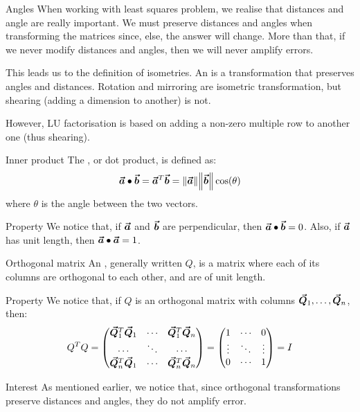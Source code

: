 \documentclass[a4paper]{article}
\begin{document}
\begin{parag}{Angles}
    When working with least squares problem, we realise that distances and angle are really important. We must preserve distances and angles when transforming the matrices since, else, the answer will change. More than that, if we never modify distances and angles, then we will never amplify errors.

    This leads us to the definition of isometries. An  is a transformation that preserves angles and distances. Rotation and mirroring are isometric transformation, but shearing (adding a dimension to another) is not.

    However, LU factorisation is based on adding a non-zero multiple row to another one (thus shearing).
\end{parag}

\begin{parag}{Inner product}
    The , or dot product, is defined as: 
    \[\bvec{a} \dotprod \bvec{b} = \bvec{a}^T \bvec{b} = \left\|\bvec{a}\right\| \left\|\bvec{b}\right\| \cos\left(\theta\right)\]
    where $\theta$ is the angle between the two vectors.

    \begin{subparag}{Property}
        We notice that, if $\bm{\protect\vec{a}}$ and $\bm{\protect\vec{b}}$ are perpendicular, then $\bm{\protect\vec{a}} \bullet \bm{\protect\vec{b}} = 0$. Also, if $\bm{\protect\vec{a}}$ has unit length, then $\bm{\protect\vec{a}} \bullet \bm{\protect\vec{a}} = 1$.
    \end{subparag}
\end{parag}

\begin{parag}{Orthogonal matrix}
    An , generally written $Q$, is a matrix where each of its columns are orthogonal to each other, and are of unit length.

    \begin{subparag}{Property}
        We notice that, if $Q$ is an orthogonal matrix with columns $\bm{\protect\vec{Q}}_1, \ldots, \bm{\protect\vec{Q}}_n$, then: 
        \[Q^T Q = \begin{pmatrix} \bm{\protect\vec{Q}}_1^T \bm{\protect\vec{Q}}_1 & \cdots & \bm{\protect\vec{Q}}_1^T \bm{\protect\vec{Q}}_n \\ \cdots & \ddots & \cdots \\ \bm{\protect\vec{Q}}_n^T \bm{\protect\vec{Q}}_1 & \cdots & \bm{\protect\vec{Q}}_n^T \bm{\protect\vec{Q}}_n \end{pmatrix} = \begin{pmatrix} 1 & \cdots & 0 \\ \vdots & \ddots & \vdots \\ 0 & \cdots & 1 \end{pmatrix} = I \]
    \end{subparag}
    
    \begin{subparag}{Interest}
        As mentioned earlier, we notice that, since orthogonal transformations preserve distances and angles, they do not amplify error.
    \end{subparag}
\end{parag}
\end{document}

